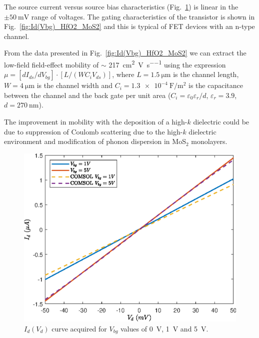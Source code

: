 \documentclass[12pt,a4paper,titlepage]{article}
\begin{document}
The source current versus source bias characteristics (Fig.~\ref{fig:Id(Vd)_HfO2_MoS2}) is linear in the $\pm \SI{50} {\milli \volt}$ range of voltages. The gating characteristics of the transistor is shown in Fig.~\ref{fig:Id(Vbg)_HfO2_MoS2} and this is typical of FET devices with an n-type channel.

From the data presented in Fig.~\ref{fig:Id(Vbg)_HfO2_MoS2} we can extract the low-field field-effect mobility of $\sim$ \SI{217}{\square \centi \meter  \per \volt \per \second} using the expression $\mu = [dI_{ds}/dV_{bg}]\cdot[L/(WC_iV_{ds})]$, where $L= \SI{1.5}{\micro \meter}$ is the channel length, $W = \SI{4}{\micro \meter}$ is the channel width and $C_i = \SI{1.3 e-4}{\farad \per \square \meter}$ is the capacitance between the channel and the back gate per unit area ($C_i = \varepsilon_0 \varepsilon_r / d$, $\varepsilon_r = 3.9$, $d = \SI{270}{\nano \meter}$).

The improvement in mobility with the deposition of a high-$k$ dielectric could be due to suppression of Coulomb scattering due to the high-$k$ dielectric environment and modification of phonon dispersion in MoS$_2$ monolayers.

\begin{figure}[H]
	\centering
	\includegraphics[width=.75\textwidth]{Grafici/Id(Vd)_HfO2_MoS2.eps} 
	\caption{$I_d(V_d)$ curve acquired for $V_{bg}$ values of \SI{0}{\volt}, \SI{1}{\volt} and \SI{5}{\volt}.}
	\label{fig:Id(Vd)_HfO2_MoS2}
\end{figure}
\end{document}
